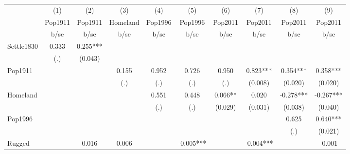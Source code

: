 {
\def\sym#1{\ifmmode^{#1}\else\(^{#1}\)\fi}
\begin{tabular}{l*{9}{c}}
\hline\hline
                    &\multicolumn{1}{c}{(1)}&\multicolumn{1}{c}{(2)}&\multicolumn{1}{c}{(3)}&\multicolumn{1}{c}{(4)}&\multicolumn{1}{c}{(5)}&\multicolumn{1}{c}{(6)}&\multicolumn{1}{c}{(7)}&\multicolumn{1}{c}{(8)}&\multicolumn{1}{c}{(9)}\\
                    &\multicolumn{1}{c}{Pop1911}&\multicolumn{1}{c}{Pop1911}&\multicolumn{1}{c}{Homeland}&\multicolumn{1}{c}{Pop1996}&\multicolumn{1}{c}{Pop1996}&\multicolumn{1}{c}{Pop2011}&\multicolumn{1}{c}{Pop2011}&\multicolumn{1}{c}{Pop2011}&\multicolumn{1}{c}{Pop2011}\\
                    &        b/se   &        b/se   &        b/se   &        b/se   &        b/se   &        b/se   &        b/se   &        b/se   &        b/se   \\
\hline
Settle1830          &       0.333   &       0.255***&               &               &               &               &               &               &               \\
                    &         (.)   &     (0.043)   &               &               &               &               &               &               &               \\
Pop1911             &               &               &       0.155   &       0.952   &       0.726   &       0.950   &       0.823***&       0.354***&       0.358***\\
                    &               &               &         (.)   &         (.)   &         (.)   &         (.)   &     (0.008)   &     (0.020)   &     (0.020)   \\
Homeland            &               &               &               &       0.551   &       0.448   &       0.066** &       0.020   &      -0.278***&      -0.267***\\
                    &               &               &               &         (.)   &         (.)   &     (0.029)   &     (0.031)   &     (0.038)   &     (0.040)   \\
Pop1996             &               &               &               &               &               &               &               &       0.625   &       0.640***\\
                    &               &               &               &               &               &               &               &         (.)   &     (0.021)   \\
Rugged              &               &       0.016   &       0.006   &               &      -0.005***&               &      -0.004***&               &      -0.001   \\

\end{tabular}}
